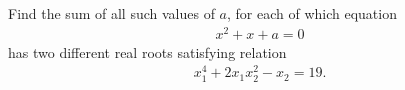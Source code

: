 Find the sum of all such values of $a$, for each of which equation
\begin{align*}
x^{2} + x + a = 0
\end{align*}
has two different real roots satisfying relation
\begin{align*}
x_{1}^{4} + 2x_{1}x_{2}^{2} - x_{2} = 19.
\end{align*}
